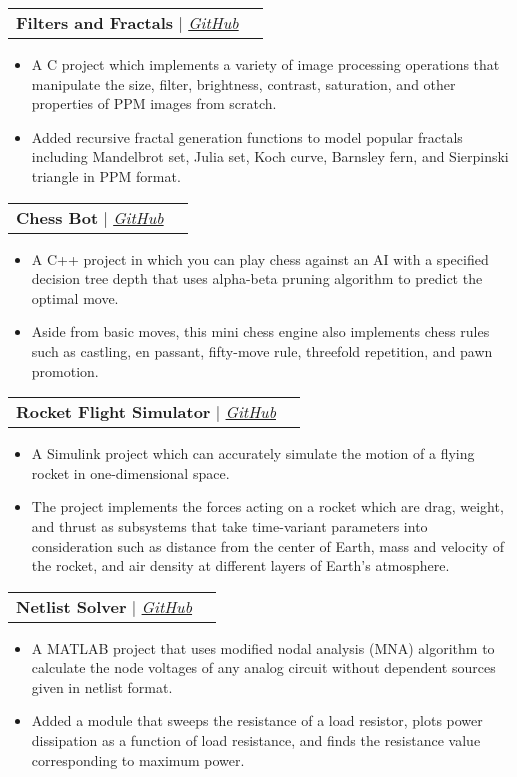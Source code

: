 \documentclass[letterpaper,11pt, english]{article}
\makeatletter
\newcommand{\resumeItem}[1]{
  \item\small{
    {#1 \vspace{-2pt}}
  }
}
\newcommand{\resumeProjectHeading}[2]{
    \vspace{-2pt}\item
    \begin{tabular*}{0.97\textwidth}{l@{\extracolsep{\fill}}r}
      \small#1 & #2 \\
    \end{tabular*}\vspace{-7pt}
}
\newcommand{\resumeItemListStart}{\begin{itemize}}
\newcommand{\resumeItemListEnd}{\end{itemize}\vspace{-5pt}}
\makeatother
\begin{document}
      \resumeProjectHeading
        {\textbf{Filters and Fractals} $|$ \emph{\href{https://github.com/arasgungore/filters-and-fractals}{\color{blue}GitHub}}}{}
          \resumeItemListStart
            \resumeItem{A C project which implements a variety of image processing operations that manipulate the size, filter, brightness, contrast, saturation, and other properties of PPM images from scratch.}
            \resumeItem{Added recursive fractal generation functions to model popular fractals including Mandelbrot set, Julia set, Koch curve, Barnsley fern, and Sierpinski triangle in PPM format.}
          \resumeItemListEnd
      
      \resumeProjectHeading
        {\textbf{Chess Bot} $|$ \emph{\href{https://github.com/arasgungore/chess-bot}{\color{blue}GitHub}}}{}
          \resumeItemListStart
            \resumeItem{A C++ project in which you can play chess against an AI with a specified decision tree depth that uses alpha-beta pruning algorithm to predict the optimal move.}
            \resumeItem{Aside from basic moves, this mini chess engine also implements chess rules such as castling, en passant, fifty-move rule, threefold repetition, and pawn promotion.}
          \resumeItemListEnd
      
      \resumeProjectHeading
        {\textbf{Rocket Flight Simulator} $|$ \emph{\href{https://github.com/arasgungore/rocket-flight-simulator}{\color{blue}GitHub}}}{}
          \resumeItemListStart
            \resumeItem{A Simulink project which can accurately simulate the motion of a flying rocket in one-dimensional space.}
            \resumeItem{The project implements the forces acting on a rocket which are drag, weight, and thrust as subsystems that take time-variant parameters into consideration such as distance from the center of Earth, mass and velocity of the rocket, and air density at different layers of Earth's atmosphere.}
          \resumeItemListEnd
      
      \resumeProjectHeading
        {\textbf{Netlist Solver} $|$ \emph{\href{https://github.com/arasgungore/netlist-solver}{\color{blue}GitHub}}}{}
          \resumeItemListStart
            \resumeItem{A MATLAB project that uses modified nodal analysis (MNA) algorithm to calculate the node voltages of any analog circuit without dependent sources given in netlist format.}
            \resumeItem{Added a module that sweeps the resistance of a load resistor, plots power dissipation as a function of load resistance, and finds the resistance value corresponding to maximum power.}
          \resumeItemListEnd
      
\end{document}
